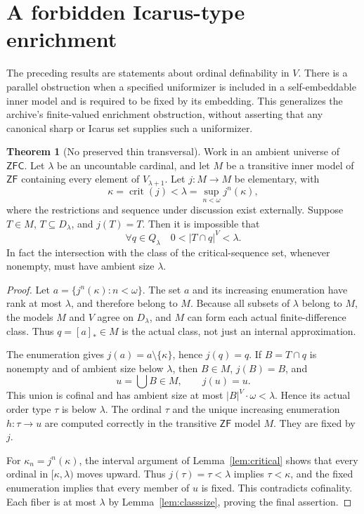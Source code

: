 \documentclass[11pt,letterpaper]{article}
\theoremstyle{definition}
\newtheorem{theorem}[definition]{Theorem}
\numberwithin{equation}{section}
\newcommand{\ZFC}{\mathsf{ZFC}}
\newcommand{\ZF}{\mathsf{ZF}}
\newcommand{\crit}{\operatorname{crit}}
\newcommand{\Dlam}{D_\lambda}
\newcommand{\Qlam}{Q_\lambda}
\newcommand{\qclass}[1]{[#1]_{*}}
\begin{document}
\section{A forbidden Icarus-type enrichment}\label{sec:icarus-new}

The preceding results are statements about ordinal definability in $V$. There is a parallel obstruction when a specified uniformizer is included in a self-embeddable inner model and is required to be fixed by its embedding. This generalizes the archive's finite-valued enrichment obstruction, without asserting that any canonical sharp or Icarus set supplies such a uniformizer.

\begin{theorem}[No preserved thin transversal]\label{thm:icarus-new}
Work in an ambient universe of $\ZFC$. Let $\lambda$ be an uncountable cardinal, and let $M$ be a transitive inner model of $\ZF$ containing every element of $V_{\lambda+1}$. Let $j:M\to M$ be elementary, with
\[
\kappa=\crit(j)<\lambda=\sup_{n<\omega}j^n(\kappa),
\]
where the restrictions and sequence under discussion exist externally. Suppose $T\in M$, $T\subseteq\Dlam$, and $j(T)=T$. Then it is impossible that
\[
\forall q\in\Qlam\quad 0<|T\cap q|^V<\lambda.
\]
In fact the intersection with the class of the critical-sequence set, whenever nonempty, must have ambient size $\lambda$.
\end{theorem}

\begin{proof}
Let $a=\{j^n(\kappa):n<\omega\}$. The set $a$ and its increasing enumeration have rank at most $\lambda$, and therefore belong to $M$. Because all subsets of $\lambda$ belong to $M$, the models $M$ and $V$ agree on $\Dlam$, and $M$ can form each actual finite-difference class. Thus $q=\qclass a\in M$ is the actual class, not just an internal approximation.

The enumeration gives $j(a)=a\setminus\{\kappa\}$, hence $j(q)=q$. If $B=T\cap q$ is nonempty and of ambient size below $\lambda$, then $B\in M$, $j(B)=B$, and
\[
u=\bigcup B\in M,\qquad j(u)=u.
\]
This union is cofinal and has ambient size at most $|B|^V\cdot\omega<\lambda$. Hence its actual order type $\tau$ is below $\lambda$. The ordinal $\tau$ and the unique increasing enumeration $h:\tau\to u$ are computed correctly in the transitive $\ZF$ model $M$. They are fixed by $j$.

For $\kappa_n=j^n(\kappa)$, the interval argument of Lemma~\ref{lem:critical} shows that every ordinal in $[\kappa,\lambda)$ moves upward. Thus $j(\tau)=\tau<\lambda$ implies $\tau<\kappa$, and the fixed enumeration implies that every member of $u$ is fixed. This contradicts cofinality. Each fiber is at most $\lambda$ by Lemma~\ref{lem:classsize}, proving the final assertion.
\end{proof}
\end{document}
